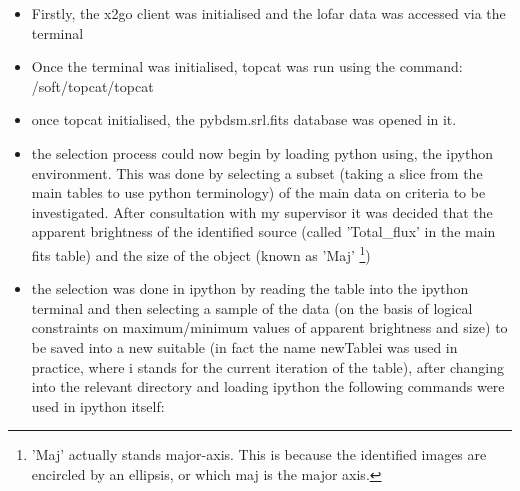 \documentclass{article}
\begin{document}
\begin{itemize}
    \item Firstly, the x2go client was initialised and the lofar data was accessed via the terminal
    \item Once the terminal was initialised, topcat was run using the command: /soft/topcat/topcat
    \item once topcat initialised, the pybdsm.srl.fits database was opened in it.
    \item the selection process could now begin by loading python using, the ipython environment. This was done by selecting a subset (taking a slice from the main tables to use python terminology) of the main data on criteria to be investigated. After consultation with my supervisor it was decided that the apparent brightness of the identified source (called 'Total{\_}flux' in the main fits table) and the size of the object (known as 'Maj' \footnote{'Maj' actually stands major-axis. This is because the identified images are encircled by an ellipsis, or which maj is the major axis.})
    \item the selection was done in ipython by reading the table into the ipython terminal and then selecting a sample of the data (on the basis of logical constraints on maximum/minimum values of apparent brightness and size) to be saved into a new suitable (in fact the name newTablei was used in practice, where i stands for the current iteration of the table), after changing into the relevant directory and loading ipython the following commands were used in ipython itself:
        

\end{itemize}
\end{document}
